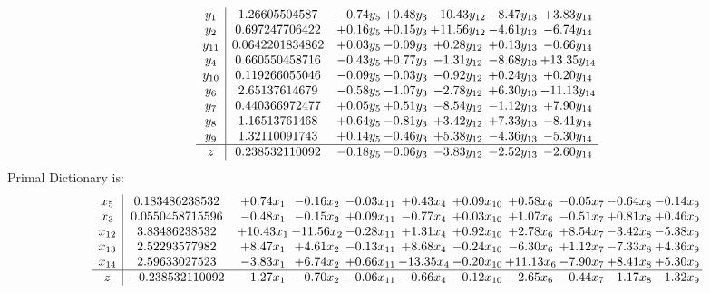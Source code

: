 \documentclass[9pt]{article}
\begin{document}
\[\begin{array}{c| c c@{\hskip 2pt} c@{\hskip 2pt} c@{\hskip 2pt} c@{\hskip 2pt} c@{\hskip 2pt} }
 y_{1}   &  1.26605504587 & -0.74 y_{5} & +  0.48 y_{3} & -10.43 y_{12} & -8.47 y_{13} & +  3.83 y_{14}\\
 y_{2}   &  0.697247706422 & +  0.16 y_{5} & +  0.15 y_{3} & + 11.56 y_{12} & -4.61 y_{13} & -6.74 y_{14}\\
 y_{11}   &  0.0642201834862 & +  0.03 y_{5} & -0.09 y_{3} & +  0.28 y_{12} & +  0.13 y_{13} & -0.66 y_{14}\\
 y_{4}   &  0.660550458716 & -0.43 y_{5} & +  0.77 y_{3} & -1.31 y_{12} & -8.68 y_{13} & + 13.35 y_{14}\\
 y_{10}   &  0.119266055046 & -0.09 y_{5} & -0.03 y_{3} & -0.92 y_{12} & +  0.24 y_{13} & +  0.20 y_{14}\\
 y_{6}   &  2.65137614679 & -0.58 y_{5} & -1.07 y_{3} & -2.78 y_{12} & +  6.30 y_{13} & -11.13 y_{14}\\
 y_{7}   &  0.440366972477 & +  0.05 y_{5} & +  0.51 y_{3} & -8.54 y_{12} & -1.12 y_{13} & +  7.90 y_{14}\\
 y_{8}   &  1.16513761468 & +  0.64 y_{5} & -0.81 y_{3} & +  3.42 y_{12} & +  7.33 y_{13} & -8.41 y_{14}\\
 y_{9}   &  1.32110091743 & +  0.14 y_{5} & -0.46 y_{3} & +  5.38 y_{12} & -4.36 y_{13} & -5.30 y_{14}\\
\hline
z    &  0.238532110092 & -0.18 y_{5} & -0.06 y_{3} & -3.83 y_{12} & -2.52 y_{13} & -2.60 y_{14}\\
\end{array}\]
Primal Dictionary is:
\[\begin{array}{c| c c@{\hskip 2pt} c@{\hskip 2pt} c@{\hskip 2pt} c@{\hskip 2pt} c@{\hskip 2pt} c@{\hskip 2pt} c@{\hskip 2pt} c@{\hskip 2pt} c@{\hskip 2pt} }
 x_{5}   &  0.183486238532 & +  0.74 x_{1} & -0.16 x_{2} & -0.03 x_{11} & +  0.43 x_{4} & +  0.09 x_{10} & +  0.58 x_{6} & -0.05 x_{7} & -0.64 x_{8} & -0.14 x_{9}\\
 x_{3}   &  0.0550458715596 & -0.48 x_{1} & -0.15 x_{2} & +  0.09 x_{11} & -0.77 x_{4} & +  0.03 x_{10} & +  1.07 x_{6} & -0.51 x_{7} & +  0.81 x_{8} & +  0.46 x_{9}\\
 x_{12}   &  3.83486238532 & + 10.43 x_{1} & -11.56 x_{2} & -0.28 x_{11} & +  1.31 x_{4} & +  0.92 x_{10} & +  2.78 x_{6} & +  8.54 x_{7} & -3.42 x_{8} & -5.38 x_{9}\\
 x_{13}   &  2.52293577982 & +  8.47 x_{1} & +  4.61 x_{2} & -0.13 x_{11} & +  8.68 x_{4} & -0.24 x_{10} & -6.30 x_{6} & +  1.12 x_{7} & -7.33 x_{8} & +  4.36 x_{9}\\
 x_{14}   &  2.59633027523 & -3.83 x_{1} & +  6.74 x_{2} & +  0.66 x_{11} & -13.35 x_{4} & -0.20 x_{10} & + 11.13 x_{6} & -7.90 x_{7} & +  8.41 x_{8} & +  5.30 x_{9}\\
\hline
z    &  -0.238532110092 & -1.27 x_{1} & -0.70 x_{2} & -0.06 x_{11} & -0.66 x_{4} & -0.12 x_{10} & -2.65 x_{6} & -0.44 x_{7} & -1.17 x_{8} & -1.32 x_{9}\\
\end{array}\]
\end{document}
